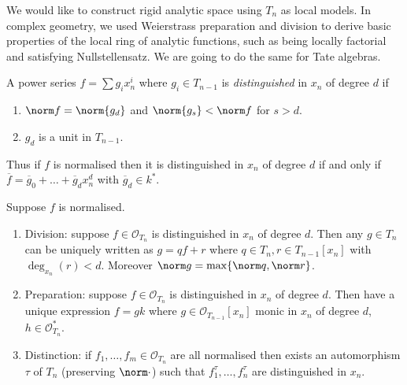 \documentclass[a4paper]{article}
\renewcommand*{\O}{\mathcal{O}}
\begin{document}
We would like to construct rigid analytic space using \(T_n\) as local models. In complex geometry, we used Weierstrass preparation and division to derive basic properties of the local ring of analytic functions, such as being locally factorial and satisfying Nullstellensatz. We are going to do the same for Tate algebras.

\begin{definition}
  A power series \(f = \sum g_i x_n^i\) where \(g_i \in T_{n - 1}\) is \emph{distinguished} in \(x_n\) of degree \(d\) if
  \begin{enumerate}
  \item \(\norm f = \norm{g_d}\) and \(\norm{g_s} < \norm f\) for \(s > d\).
  \item \(g_d\) is a unit in \(T_{n - 1}\).
  \end{enumerate}
\end{definition}
Thus if \(f\) is normalised then it is distinguished in \(x_n\) of degree \(d\) if and only if \(\overline f = \overline g_0 + \dots + \overline g_d x_n^d\) with \(\overline g_d \in k^*\).

\begin{theorem}
  Suppose \(f\) is normalised.
  \begin{enumerate}
  \item Division: suppose \(f \in \O_{T_n}\) is distinguished in \(x_n\) of degree \(d\). Then any \(g \in T_n\) can be uniquely written as \(g = qf + r\) where \(q \in T_n, r \in T_{n - 1}[x_n]\) with \(\deg_{x_n}(r) < d\). Moreover \(\norm g = \max\{\norm q, \norm r\}\).
  \item Preparation: suppose \(f \in \O_{T_n}\) is distinguished in \(x_n\) of degree \(d\). Then have a unique expression \(f = gk\) where \(g \in \O_{T_{n - 1}}[x_n]\) monic in \(x_n\) of degree \(d\), \(h \in \O_{T_n}^*\).
  \item Distinction: if \(f_1, \dots, f_m \in \O_{T_n}\) are all normalised then exists an automorphism \(\tau\) of \(T_n\) (preserving \(\norm \cdot\)) such that \(f_1^\tau, \dots, f_n^\tau\) are distinguished in \(x_n\).
  \end{enumerate}
\end{theorem}
\end{document}
